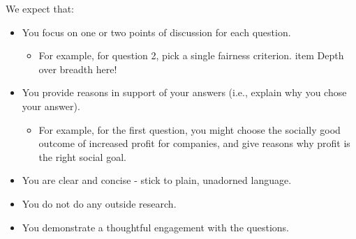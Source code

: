 \documentclass[submit]{harvardml}
\begin{document}
\begin{problem}
We expect that:
\begin{itemize}
\item You focus on one or two points of discussion for each question. 
\begin{itemize}
\item For example, for question 2, pick a single fairness criterion. 
item Depth over breadth here! 
\end{itemize}
\item You provide reasons in support of your answers (i.e., explain why you chose your answer).
\begin{itemize}
\item For example, for the first question, you might choose the socially good outcome of increased profit for companies, and give reasons why profit is the right social goal.
\end{itemize}
\item You are clear and concise - stick to plain, unadorned language.  
\item You do not do any outside research. 
\item You demonstrate a thoughtful engagement with the questions. 
\end{itemize}


\end{problem}
\end{document}
